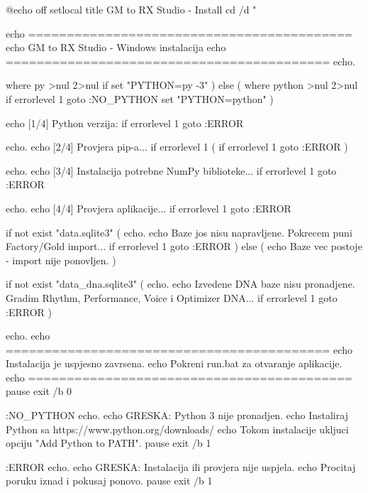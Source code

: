 @echo off
setlocal
title GM to RX Studio - Install
cd /d "%

echo ==========================================
echo   GM to RX Studio - Windows instalacija
echo ==========================================
echo.

where py >nul 2>nul
if %
    set "PYTHON=py -3"
) else (
    where python >nul 2>nul
    if errorlevel 1 goto :NO_PYTHON
    set "PYTHON=python"
)

echo [1/4] Python verzija:
if errorlevel 1 goto :ERROR

echo.
echo [2/4] Provjera pip-a...
if errorlevel 1 (
    if errorlevel 1 goto :ERROR
)

echo.
echo [3/4] Instalacija potrebne NumPy biblioteke...
if errorlevel 1 goto :ERROR

echo.
echo [4/4] Provjera aplikacije...
if errorlevel 1 goto :ERROR

if not exist "data\factory.sqlite3" (
    echo.
    echo Baze jos nisu napravljene. Pokrecem puni Factory/Gold import...
    if errorlevel 1 goto :ERROR
) else (
    echo Baze vec postoje - import nije ponovljen.
)

if not exist "data\performance_dna.sqlite3" (
    echo.
    echo Izvedene DNA baze nisu pronadjene. Gradim Rhythm, Performance, Voice i Optimizer DNA...
    if errorlevel 1 goto :ERROR
)

echo.
echo ==========================================
echo   Instalacija je uspjesno zavrsena.
echo   Pokreni run.bat za otvaranje aplikacije.
echo ==========================================
pause
exit /b 0

:NO_PYTHON
echo.
echo GRESKA: Python 3 nije pronadjen.
echo Instaliraj Python sa https://www.python.org/downloads/
echo Tokom instalacije ukljuci opciju "Add Python to PATH".
pause
exit /b 1

:ERROR
echo.
echo GRESKA: Instalacija ili provjera nije uspjela.
echo Procitaj poruku iznad i pokusaj ponovo.
pause
exit /b 1
